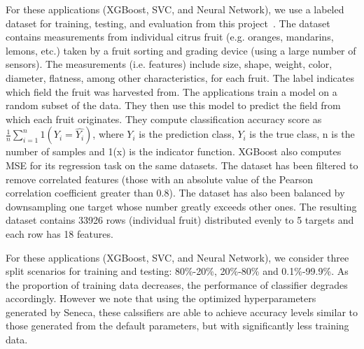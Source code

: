 For these applications (XGBoost, SVC, and Neural Network), we use a labeled
dataset for training, testing, and evaluation from this
project~\cite{iot-cpu}. The dataset contains measurements from individual
citrus fruit (e.g. oranges, mandarins, lemons, etc.) taken by a fruit sorting
and grading device (using a large number of sensors).  The measurements (i.e.
features) include size, shape, weight, color, diameter, flatness, among other
characteristics, for each fruit.  The label indicates which field the fruit
was harvested from.  The applications train a model on a random subset of the
data.  They then use this model to predict the field
from which each fruit originates. They compute classification accuracy score
as $\frac{1}{n}\sum_{i=1}^{n}1(Y_i = \hat{Y_i})$, where $Y_i$ is the
prediction class, $Y_i$ is the true class, n is the number of samples and 1(x)
is the indicator function. XGBoost also computes MSE for its regression task
on the same datasets. The dataset has been filtered to remove correlated
features (those with an absolute value of the Pearson correlation coefficient
greater than 0.8). The dataset has also been balanced by downsampling one
target whose number greatly exceeds other ones. The resulting dataset contains
33926 rows (individual fruit) distributed evenly to 5 targets and each row has
18 features.



For these applications (XGBoost, SVC, and Neural Network), we consider three
split scenarios for training and testing: 80\%-20\%, 20\%-80\% and
0.1\%-99.9\%. As the proportion of training data decreases, the performance of
classifier degrades accordingly.  However we note that using the optimized
hyperparameters generated by Seneca, these calssifiers are able to achieve
accuracy levels similar to those generated from the default parameters, but
with significantly less training data.

